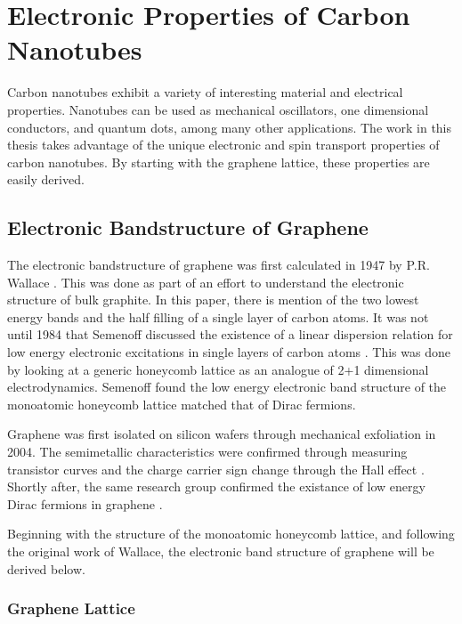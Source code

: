 
\chapter{Electronic Properties of Carbon Nanotubes}
\label{sec:CNT}

Carbon nanotubes exhibit a variety of interesting material and electrical properties. Nanotubes can be used as mechanical oscillators, one dimensional conductors, and quantum dots, among many other applications. The work in this thesis takes advantage of the unique electronic and spin transport properties of carbon nanotubes. By starting with the graphene lattice, these properties are easily derived. 

\section{Electronic Bandstructure of Graphene}

The electronic bandstructure of graphene was first calculated in 1947 by P.R. Wallace \cite{Wallace1947}. This was done as part of an effort to understand the electronic structure of bulk graphite. In this paper, there is mention of the two lowest energy bands and the half filling of a single layer of carbon atoms. It was not until 1984 that Semenoff discussed the existence of a linear dispersion relation for low energy electronic excitations in single layers of carbon atoms \cite{Semenoff1984}. This was done by looking at a generic honeycomb lattice as an analogue of 2+1 dimensional electrodynamics. Semenoff found the low energy electronic band structure of the monoatomic honeycomb lattice matched that of Dirac fermions.

Graphene was first isolated on silicon wafers through mechanical exfoliation in 2004. The semimetallic characteristics were confirmed through measuring transistor curves and the charge carrier sign change through the Hall effect \cite{Novoselov2004}. Shortly after, the same research group confirmed the existance of low energy Dirac fermions in graphene \cite{Novoselov2005}.

Beginning with the structure of the monoatomic honeycomb lattice, and following the original work of Wallace, the electronic band structure of graphene will be derived below.

\subsection{Graphene Lattice}

